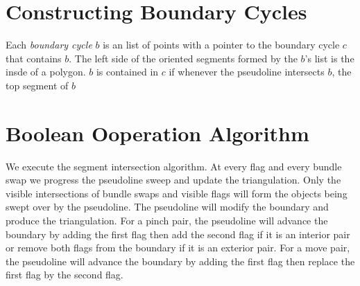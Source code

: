 \documentclass[11pt]{article}
\begin{document}
\section{Constructing Boundary Cycles} \label{sec bcycle}
Each \textit{boundary cycle} $b$ is an list of points with a pointer to the boundary cycle $c$ that contains $b$.
The left side of the oriented segments formed by the $b$'s list is the insde of a polygon.
$b$ is contained in $c$ if whenever the pseudoline intersects $b$, the top segment of $b$ 


\section{Boolean Ooperation Algorithm}
We execute the segment intersection algorithm.
At every flag and every bundle swap we progress the pseudoline sweep and update the triangulation.
Only the visible intersections of bundle swaps and visible flags will form the objects being swept over by the pseudoline.
The pseudoline will modify the boundary and produce the triangulation.
For a pinch pair, the pseudoline will advance the boundary by adding the first flag then add the second flag if it is an interior pair or remove both flags from the boundary if it is an exterior pair.
For a move pair, the pseudoline will advance the boundary by adding the first flag then replace the first flag by the second flag.
\end{document}
